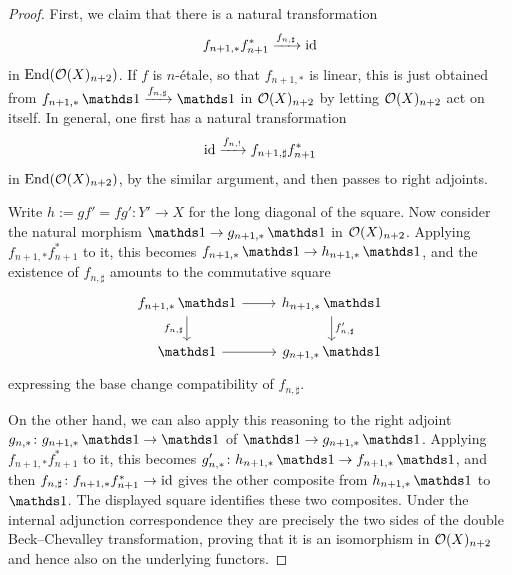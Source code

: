 \documentclass[11pt]{book}
\begin{document}
	\begin{proof}
		First, we claim that there is a natural transformation
		\[
			f_{n+1,*}f_{n+1}^* \xrightarrow{f_{n,\sharp}} \operatorname{id}
		\]
		in $\operatorname{End}(\mathcal{O}(X)_{n+2})$. If $f$ is $n$-étale, so that $f_{n+1,*}$ is linear, this is just obtained from $f_{n+1,*}\unit \xrightarrow{f_{n,\sharp}} \unit$ in $\mathcal{O}(X)_{n+2}$ by letting $\mathcal{O}(X)_{n+2}$ act on itself. In general, one first has a natural transformation
		\[
			\operatorname{id} \xrightarrow{f_{n,!}} f_{n+1,\sharp}f_{n+1}^*
		\]
		in $\operatorname{End}(\mathcal{O}(X)_{n+2})$, by the similar argument, and then passes to right adjoints.

		Write $h := g f' = f g'\colon Y' \to X$ for the long diagonal of the square. Now consider the natural morphism $\unit \to g_{n+1,*}\unit$ in $\mathcal{O}(X)_{n+2}$. Applying $f_{n+1,*}f_{n+1}^*$ to it, this becomes $f_{n+1,*}\unit \to h_{n+1,*}\unit$, and the existence of $f_{n,\sharp}$ amounts to the commutative square
		\[\begin{tikzcd}
			f_{n+1,*}\unit \rar \dar["{f_{n,\sharp}}"'] & h_{n+1,*}\unit \dar["{f'_{n,\sharp}}"] \\
			\unit \rar & g_{n+1,*}\unit
		\end{tikzcd}\]
		expressing the base change compatibility of $f_{n,\sharp}$.

		On the other hand, we can also apply this reasoning to the right adjoint $g_{n,*}\colon g_{n+1,*}\unit \to \unit$ of $\unit \to g_{n+1,*}\unit$. Applying $f_{n+1,*}f_{n+1}^*$ to it, this becomes $g'_{n,*}\colon h_{n+1,*}\unit \to f_{n+1,*}\unit$, and then $f_{n,\sharp}\colon f_{n+1,*}f_{n+1}^* \to \operatorname{id}$ gives the other composite from $h_{n+1,*}\unit$ to $\unit$. The displayed square identifies these two composites. Under the internal adjunction correspondence they are precisely the two sides of the double Beck--Chevalley transformation, proving that it is an isomorphism in $\mathcal{O}(X)_{n+2}$ and hence also on the underlying functors.
	\end{proof}
\end{document}
